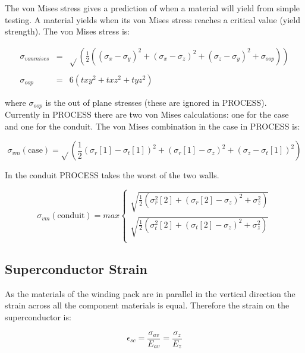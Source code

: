 \documentclass[hidelinks]{article}
\numberwithin{equation}{section}
\begin{document}
    The von Mises stress gives a prediction of when a material will yield from simple 
    testing. A material yields when its von Mises stress reaches a critical value 
    (yield strength). The von Mises stress is:

    \begin{eqnarray}
        \sigma_{vonmises} &=& \sqrt{}(\frac{1}{2}((\sigma_x-\sigma_y)^2 + 
        (\sigma_x-\sigma_z)^2 + (\sigma_z-\sigma_y)^2 + 
        \sigma_{oop}))\\
        \nonumber \\
        \sigma_{oop} &=& 6(txy^2 + txz^2 + tyz^2)
    \end{eqnarray} 

    \noi where $\sigma_{oop}$ is the out of plane stresses (these are ignored in PROCESS). 
    Currently in PROCESS there are two von Mises calculations: one for the case and one 
    for the conduit. The von Mises combination in the case in PROCESS is:

    \begin{equation}\label{eq: case-von-mises}
        \sigma_{vm} (\text{case}) = \sqrt{}(\frac{1}{2}(\sigma_r[1]-\sigma_t[1])^2 + 
        (\sigma_r[1]-\sigma_z)^2 + (\sigma_z-\sigma_t[1])^2)
    \end{equation}

    \noi In the conduit PROCESS takes the worst of the two walls.

    \begin{equation}\label{eq: conduit-von-mises}
    \sigma_{vm}(\text{conduit}) = max
    \begin{cases}
        \sqrt{ \frac{1}{2}(\sigma_r^2[2] + (\sigma_r[2] - \sigma_z)^2 + \sigma_z^2) }\\
        \sqrt{ \frac{1}{2}(\sigma_t^2[2] + (\sigma_t[2] - \sigma_z)^2 + \sigma_z^2) }\\
    \end{cases}
    \end{equation}

    \subsection{Superconductor Strain}

    As the materials of the winding pack are in parallel in the vertical direction the 
    strain across all the component materials is equal. Therefore the strain on the 
    superconductor is:

    \begin{equation}\label{eq: sc-strain}
        \epsilon_{sc} = \frac{\sigma_{av}}{E_{av}} = \frac{\sigma_z}{E_z}
    \end{equation}
\end{document}
